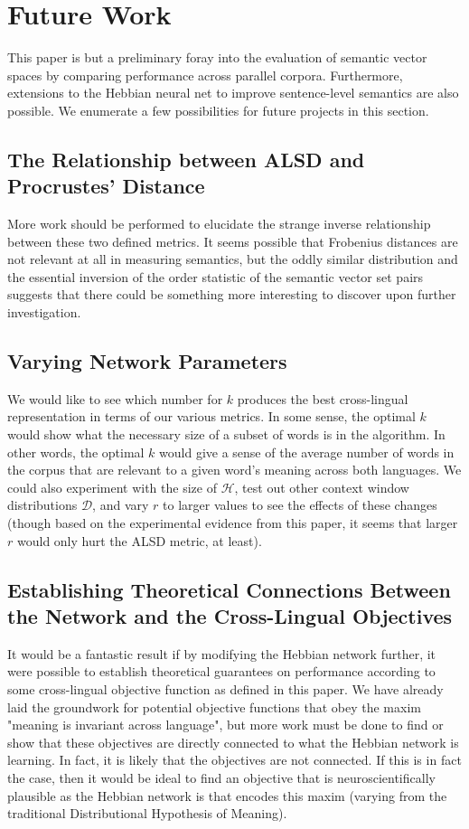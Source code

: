 \documentclass[12pt, usenames]{article}
\theoremstyle{definition}
\theoremstyle{definition}
\theoremstyle{definition}
\newcommand{\mc}[1]
{\mathcal{#1}}
\begin{document}
\section{Future Work} 

This paper is but a preliminary foray into the evaluation of semantic vector spaces by comparing performance across parallel corpora. Furthermore, extensions to the Hebbian neural net to improve sentence-level semantics are also possible. We enumerate a few possibilities for future projects in this section.

\subsection{The Relationship between ALSD and Procrustes' Distance}
More work should be performed to elucidate the strange inverse relationship between these two defined metrics. It seems possible that Frobenius distances are not relevant at all in measuring semantics, but the oddly similar distribution and the essential inversion of the order statistic of the semantic vector set pairs suggests that there could be something more interesting to discover upon further investigation.

\subsection{Varying Network Parameters}
We would like to see which number for $k$ produces the best cross-lingual representation in terms of our various metrics. In some sense, the optimal $k$ would show what the necessary size of a subset of words is in the algorithm. In other words, the optimal $k$ would give a sense of the average number of words in the corpus that are relevant to a given word's meaning across both languages.
We could also experiment with the size of $\mc{H}$, test out other context window distributions $\mc{D}$, and vary $r$ to larger values to see the effects of these changes (though based on the experimental evidence from this paper, it seems that larger $r$ would only hurt the ALSD metric, at least). 

\subsection{Establishing Theoretical Connections Between the Network and the Cross-Lingual Objectives}
It would be a fantastic result if by modifying the Hebbian network further, it were possible to establish theoretical guarantees on performance according to some cross-lingual objective function as defined in this paper. We have already laid the groundwork for potential objective functions that obey the maxim "meaning is invariant across language", but more work must be done to find or show that these objectives are directly connected to what the Hebbian network is learning. In fact, it is likely that the objectives are not connected. If this is in fact the case, then it would be ideal to find an objective that is neuroscientifically plausible as the Hebbian network is that encodes this maxim (varying from the traditional Distributional Hypothesis of Meaning). 
\end{document}
